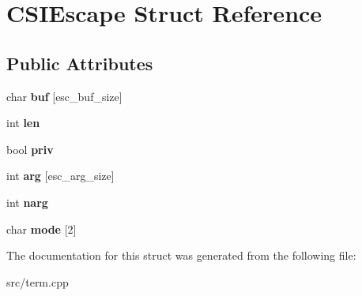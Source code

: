 \hypertarget{structCSIEscape}{}\section{C\+S\+I\+Escape Struct Reference}
\label{structCSIEscape}
\subsection*{Public Attributes}
\begin{DoxyCompactItemize}
\item 
\mbox{\label{structCSIEscape_a0e82aaca7320352e1906bc1f285531c8}} 
char {\bfseries buf} \mbox{[}esc\+\_\+buf\+\_\+size\mbox{]}
\item 
\mbox{\label{structCSIEscape_a5d6ca2d3ae9ede5ad6541253323fc7a2}} 
int {\bfseries len}
\item 
\mbox{\label{structCSIEscape_a99db61800e27d7be61ed085edd0e712f}} 
bool {\bfseries priv}
\item 
\mbox{\label{structCSIEscape_a8874ab814023cee871943447874b277e}} 
int {\bfseries arg} \mbox{[}esc\+\_\+arg\+\_\+size\mbox{]}
\item 
\mbox{\label{structCSIEscape_a5f013ff7d362987f0fdec215abb92b67}} 
int {\bfseries narg}
\item 
\mbox{\label{structCSIEscape_a258c0909e5f976c7c17a7c312fb3419f}} 
char {\bfseries mode} \mbox{[}2\mbox{]}
\end{DoxyCompactItemize}


The documentation for this struct was generated from the following file\+:\begin{DoxyCompactItemize}
\item 
src/term.\+cpp\end{DoxyCompactItemize}
